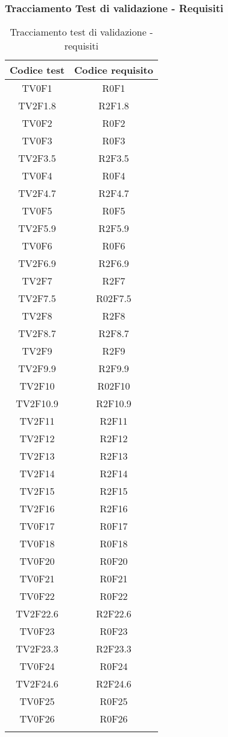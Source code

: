 	\subsubsection{Tracciamento Test di validazione - Requisiti}
\normalsize
\begin{longtable}{|c|c|}
	\hline
	\textbf{Codice test} & \textbf{Codice requisito} \\
	\hline
	\endhead
	TV0F1 & R0F1\\
	\hline
	TV2F1.8 & R2F1.8\\
	\hline
	TV0F2 & R0F2\\
	\hline
	TV0F3 & R0F3\\
	\hline
	TV2F3.5 & R2F3.5\\
	\hline
	TV0F4 & R0F4\\
	\hline
	TV2F4.7 & R2F4.7\\
	\hline
	TV0F5 & R0F5\\
	\hline
	TV2F5.9 & R2F5.9\\
	\hline
	TV0F6 & R0F6\\
	\hline
	TV2F6.9 & R2F6.9\\
	\hline
	TV2F7 & R2F7\\
	\hline
	TV2F7.5 & R02F7.5\\
	\hline
	TV2F8 & R2F8\\
	\hline
	TV2F8.7 & R2F8.7\\
	\hline
	TV2F9 & R2F9\\
	\hline
	TV2F9.9 & R2F9.9\\
	\hline
	TV2F10 & R02F10\\
	\hline
	TV2F10.9 & R2F10.9\\
	\hline
	TV2F11 & R2F11\\
	\hline
	TV2F12 & R2F12\\
	\hline
	TV2F13 & R2F13\\
	\hline
	TV2F14 & R2F14\\
	\hline
	TV2F15 & R2F15\\
	\hline
	TV2F16 & R2F16\\
	\hline
	TV0F17 & R0F17\\
	\hline
	TV0F18 & R0F18\\
	\hline
	TV0F20 & R0F20\\
	\hline
	TV0F21 & R0F21\\
	\hline
	TV0F22 & R0F22\\
	\hline
	TV2F22.6 & R2F22.6\\
	\hline
	TV0F23 & R0F23\\
	\hline
	TV2F23.3 & R2F23.3\\
	\hline
	TV0F24 & R0F24\\
	\hline
	TV2F24.6 & R2F24.6\\
	\hline
	TV0F25 & R0F25\\
	\hline
	TV0F26 & R0F26\\
	\hline
	\caption[Tracciamento test di validazione - requisiti]{Tracciamento test di validazione - requisiti}
\end{longtable}
\clearpage
	
